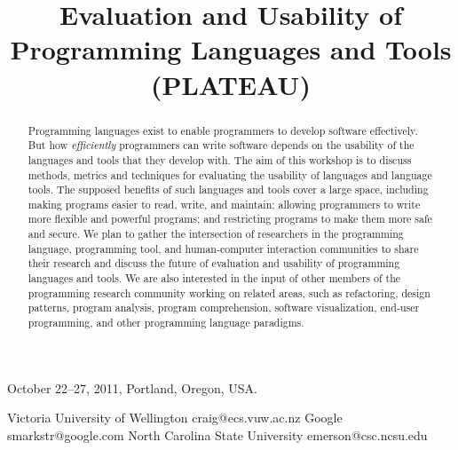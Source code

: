 \documentclass{sigplanconf}
\begin{document}
\authorpermission
{} {October 22--27, 2011, Portland, Oregon, USA.}

\title{Evaluation and Usability of Programming Languages and Tools (PLATEAU)}

           {Victoria University of Wellington}
           {craig@ecs.vuw.ac.nz}
           {Google}
           {smarkstr@google.com}      
           {North Carolina State University}
           {emerson@csc.ncsu.edu}
\date{}

\maketitle
\begin{abstract}

  Programming languages exist to enable programmers to develop
  software effectively.  But how \emph{efficiently} programmers can
  write software depends on the usability of the languages and tools
  that they develop with.  The aim of this workshop is to discuss
  methods, metrics and techniques for evaluating the usability of
  languages and language tools.  The supposed benefits of such
  languages and tools cover a large space, including making programs
  easier to read, write, and maintain; allowing programmers to write
  more flexible and powerful programs; and restricting programs to
  make them more safe and secure. We plan to gather the intersection
  of researchers in the programming language, programming tool, and
  human-computer interaction communities to share their research and
  discuss the future of evaluation and usability of programming
  languages and tools. We are also interested in the input of other
  members of the programming research community working on related
  areas, such as refactoring, design patterns, program analysis,
  program comprehension, software visualization, end-user programming,
  and other programming language paradigms.

\end{abstract}




\end{document}
